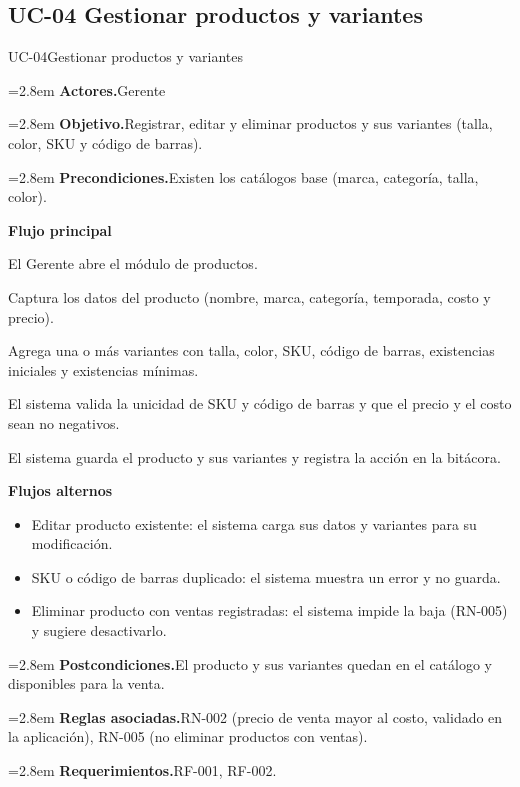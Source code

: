 \documentclass[11pt]{article}
\newcommand{\fila}[2]{\par\smallskip\noindent\hangindent=2.8em\hangafter=0
  \textbf{\sffamily\color{brand!80!black}#1.}\hspace{0.4em}#2\par}
\newcommand{\bloque}[1]{\par\smallskip\noindent\textbf{\sffamily\color{brand!80!black}#1}\par\nopagebreak}
\newenvironment{alternos}{\begin{itemize}[leftmargin=2.9em, itemsep=0.2ex, topsep=0.3ex]}{\end{itemize}}
\begin{document}
\subsection{UC-04 Gestionar productos y variantes}
\begin{ficha}{UC-04}{Gestionar productos y variantes}
\fila{Actores}{Gerente}
\fila{Objetivo}{Registrar, editar y eliminar productos y sus variantes (talla, color, SKU y código de barras).}
\fila{Precondiciones}{Existen los catálogos base (marca, categoría, talla, color).}
\bloque{Flujo principal}
\begin{pasos}
  \item El Gerente abre el módulo de productos.
  \item Captura los datos del producto (nombre, marca, categoría, temporada, costo y precio).
  \item Agrega una o más variantes con talla, color, SKU, código de barras, existencias iniciales y existencias mínimas.
  \item El sistema valida la unicidad de SKU y código de barras y que el precio y el costo sean no negativos.
  \item El sistema guarda el producto y sus variantes y registra la acción en la bitácora.
\end{pasos}
\bloque{Flujos alternos}
\begin{alternos}
  \item[\textbf{2a.}] Editar producto existente: el sistema carga sus datos y variantes para su modificación.
  \item[\textbf{4a.}] SKU o código de barras duplicado: el sistema muestra un error y no guarda.
  \item[\textbf{5a.}] Eliminar producto con ventas registradas: el sistema impide la baja (RN-005) y sugiere desactivarlo.
\end{alternos}
\fila{Postcondiciones}{El producto y sus variantes quedan en el catálogo y disponibles para la venta.}
\fila{Reglas asociadas}{RN-002 (precio de venta mayor al costo, validado en la aplicación), RN-005 (no eliminar productos con ventas).}
\fila{Requerimientos}{RF-001, RF-002.}
\end{ficha}
\end{document}
